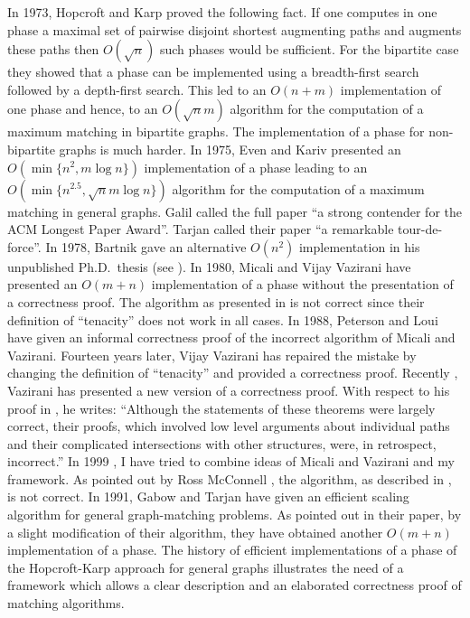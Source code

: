 \documentclass[12pt,twoside,a4paper]{article}
\begin{document}
In 1973, Hopcroft and Karp \cite{HK} proved the following fact. If one computes
in one phase a maximal set of pairwise disjoint shortest augmenting paths and augments 
these paths then $O(\sqrt{n})$ such
phases would be sufficient. For the bipartite case they showed that a phase can
be implemented using a breadth-first search followed by a depth-first search.
This led to an $O(n+m)$ implementation of one phase and hence, to an $O(\sqrt{n}m)$
algorithm for the computation of a maximum matching in bipartite graphs.
The implementation of a phase for non-bipartite graphs is much harder.
In 1975, Even and Kariv \cite{EK,Ka} presented an $O(\min\{n^2,m\log n\})$
implementation of a phase leading to an $O(\min\{n^{2.5},\sqrt{n}m\log n\})$ 
algorithm for the computation of a maximum matching in general graphs.
Galil \cite{Gal} called the full paper \cite{Ka} ``a strong contender for the ACM 
Longest Paper Award''. Tarjan \cite{Ta} called their paper ``a remarkable 
tour-de-force''.
In 1978, Bartnik \cite{Bar} gave an alternative $O(n^2)$ implementation
in his unpublished Ph.D.~thesis (see \cite{GoMi}).
In 1980, Micali and Vijay Vazirani \cite{MV} have presented an $O(m+n)$
implementation of a phase without the presentation of a correctness proof. 
The algorithm as presented in \cite{MV} is not correct since their definition
of ``tenacity'' does not work in all cases. In 1988, Peterson and Loui
have given an informal correctness proof of the incorrect algorithm of Micali
and Vazirani. Fourteen years later, Vijay Vazirani \cite{Va1} has repaired the 
mistake by changing the definition of ``tenacity'' and provided a correctness proof. 
Recently \cite{Va2}, Vazirani has presented a new version of a correctness proof.
With respect to his proof in \cite{Va1}, he writes: ``Although the statements of these theorems
were largely correct, their proofs, which involved low level arguments about individual
paths and their complicated intersections with other structures, were, in retrospect,
incorrect.'' In 1999 \cite{Bl3}, I have tried to
combine ideas of Micali and Vazirani and my framework. As pointed out by Ross McConnell
\cite{Mc}, the algorithm, as described in \cite{Bl3}, is not correct. In 1991,
Gabow and Tarjan \cite{GaTa2} have given an efficient scaling algorithm for general
graph-matching problems. As pointed out in their paper, by a slight modification of
their algorithm, they have obtained another $O(m+n)$ implementation of a phase.
The history of efficient implementations of a phase of the Hopcroft-Karp approach
for general graphs illustrates the need of a framework which allows a clear description 
and an elaborated correctness proof of matching algorithms.
\end{document}
